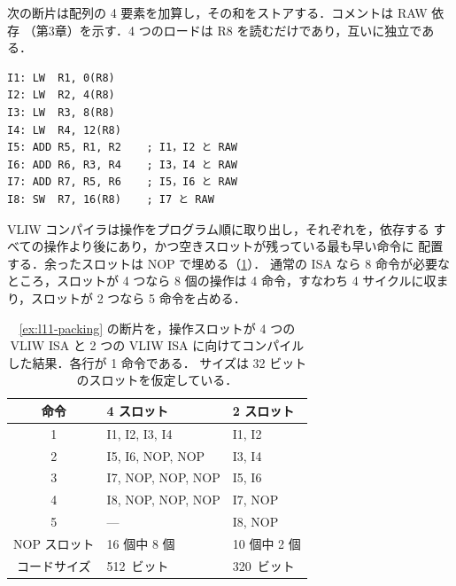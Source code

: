 \documentclass[../main.tex]{subfiles}
\begin{document}
\begin{example}[命令への操作の詰め込み]
  \label{ex:l11-packing}
  次の断片は配列の 4 要素を加算し，その和をストアする．コメントは RAW 依存
  （第3章）を示す．4 つのロードは R8 を読むだけであり，互いに独立である．
  \begin{lstlisting}[language={[x86masm]Assembler}, numbers=none]
I1: LW  R1, 0(R8)
I2: LW  R2, 4(R8)
I3: LW  R3, 8(R8)
I4: LW  R4, 12(R8)
I5: ADD R5, R1, R2    ; I1，I2 と RAW
I6: ADD R6, R3, R4    ; I3，I4 と RAW
I7: ADD R7, R5, R6    ; I5，I6 と RAW
I8: SW  R7, 16(R8)    ; I7 と RAW
\end{lstlisting}
  VLIW コンパイラは操作をプログラム順に取り出し，それぞれを，依存する
  すべての操作より後にあり，かつ空きスロットが残っている最も早い命令に
  配置する．余ったスロットは NOP で埋める（\cref{tab:l11-packing}）．%
  通常の ISA なら 8 命令が必要なところ，スロットが 4 つなら 8 個の操作は
  4 命令，すなわち 4 サイクルに収まり，スロットが 2 つなら 5 命令を占める．
\end{example}

\begin{table}[htbp]
  \centering\small
  \caption{\cref{ex:l11-packing} の断片を，操作スロットが 4 つの VLIW ISA
    と 2 つの VLIW ISA に向けてコンパイルした結果．各行が 1 命令である．
    サイズは 32 ビットのスロットを仮定している．}
  \label{tab:l11-packing}
  \begin{tabular}{@{}cll@{}}
    \toprule
    命令         & 4 スロット         & 2 スロット \\
    \midrule
    1            & I1, I2, I3, I4     & I1, I2 \\
    2            & I5, I6, NOP, NOP   & I3, I4 \\
    3            & I7, NOP, NOP, NOP  & I5, I6 \\
    4            & I8, NOP, NOP, NOP  & I7, NOP \\
    5            & ---                & I8, NOP \\
    \midrule
    NOP スロット & 16 個中 8 個       & 10 個中 2 個 \\
    コードサイズ & 512~ビット         & 320~ビット \\
    \bottomrule
  \end{tabular}
\end{table}
\end{document}
